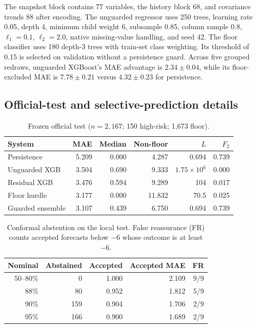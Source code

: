 \documentclass{article}
\begin{document}
The snapshot block contains 77 variables, the history block 68, and covariance trends 88 after encoding. The unguarded regressor uses 250 trees, learning rate 0.05, depth 4, minimum child weight 6, subsample 0.85, column sample 0.8, $\ell_1=0.1$, $\ell_2=2.0$, native missing-value handling, and seed 42. The floor classifier uses 180 depth-3 trees with train-set class weighting. Its threshold of 0.15 is selected on validation without a persistence guard. Across five grouped redraws, unguarded XGBoost's MAE advantage is $2.34\pm0.04$, while its floor-excluded MAE is $7.78\pm0.21$ versus $4.32\pm0.23$ for persistence.

\subsection{Official-test and selective-prediction details}

\begin{table}[h]
  \caption{Frozen official test ($n=2,167$; 150 high-risk; 1,673 floor).}
  \centering
  \small
  \begin{tabular}{lrrrrr}
    \toprule
    System & MAE & Median & Non-floor & $L$ & $F_2$ \\
    \midrule
    Persistence & 5.209 & 0.000 & 4.287 & 0.694 & 0.739 \\
    Unguarded XGB & 3.504 & 0.690 & 9.333 & $1.75\!\times\!10^6$ & 0.000 \\
    Residual XGB & 3.476 & 0.594 & 9.289 & 104 & 0.017 \\
    Floor hurdle & 3.177 & 0.000 & 11.832 & 70.5 & 0.025 \\
    Guarded ensemble & 3.107 & 0.439 & 6.750 & 0.694 & 0.739 \\
    \bottomrule
  \end{tabular}
\end{table}

\begin{table}[h]
  \caption{Conformal abstention on the local test. False reassurance (FR) counts accepted forecasts below $-6$ whose outcome is at least $-6$.}
  \centering
  \small
  \begin{tabular}{rrrrr}
    \toprule
    Nominal & Abstained & Accepted & Accepted MAE & FR \\
    \midrule
    50--80\% & 0 & 1.000 & 2.109 & 9/9 \\
    88\% & 80 & 0.952 & 1.812 & 5/9 \\
    90\% & 159 & 0.904 & 1.706 & 2/9 \\
    95\% & 166 & 0.900 & 1.689 & 2/9 \\
    \bottomrule
  \end{tabular}
\end{table}
\end{document}
